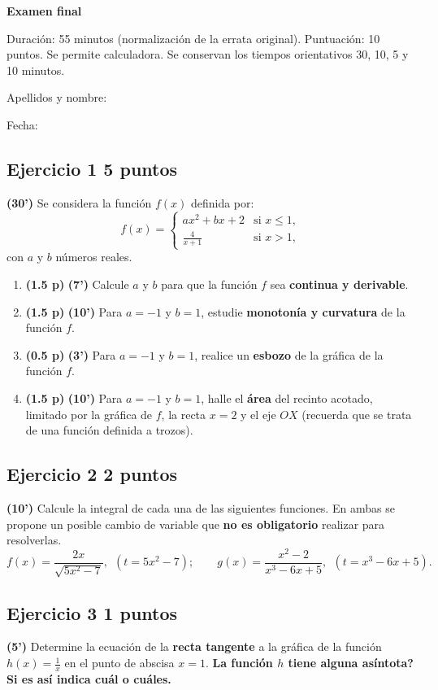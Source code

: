 \documentclass[11pt]{article}
\begin{document}
{\Large\bfseries Examen final}

Duración: 55 minutos (normalización de la errata original). Puntuación: 10 puntos. Se permite calculadora. Se conservan los tiempos orientativos 30, 10, 5 y 10 minutos.

Apellidos y nombre: \hrulefill

Fecha: \hrulefill


\subsection*{Ejercicio 1 \hfill 5 puntos} \textbf{(30')} Se considera la función \( f(x) \) definida por:
\[
f(x) = 
\begin{cases}
ax^2 + bx + 2 & \text{si } x \leq 1, \\
\displaystyle\frac{4}{x+1} & \text{si } x > 1,
\end{cases}
\]
con \( a \) y \( b \) números reales.

\begin{enumerate}
    \item[\textbf{a)}] \textbf{(1.5 p)} \textbf{(7')} Calcule \( a \) y \( b \) para que la función \( f \) sea \textbf{continua y derivable}.    
    \item[\textbf{b)}] \textbf{(1.5 p)} \textbf{(10')} Para \( a = -1 \) y \( b = 1 \), estudie \textbf{monotonía y curvatura} de la función \( f \).
    \item[\textbf{c)}] \textbf{(0.5 p)} \textbf{(3')} Para \( a = -1 \) y \( b = 1 \), realice un \textbf{esbozo} de la gráfica de la función \( f \).
    \item[\textbf{d)}] \textbf{(1.5 p)} \textbf{(10')} Para \( a = -1 \) y \( b = 1 \), halle el \textbf{área} del recinto acotado, limitado por la gráfica de \( f \), la recta \( x = 2 \) y el eje \( OX \) (recuerda que se trata de una función definida a trozos).
\end{enumerate}

 \subsection*{Ejercicio 2 \hfill 2 puntos}\textbf{(10')} Calcule la integral de cada una de las siguientes funciones. En ambas se propone un posible cambio de variable que \textbf{no es obligatorio} realizar para resolverlas.
\[
f(x) = \frac{2x}{\sqrt{5x^2-7}},~~(t=5x^2-7); \qquad g(x) = \frac{x^2-2}{x^3-6x+5},~~ (t=x^3-6x+5).
\]

\clearpage
\subsection*{Ejercicio 3 \hfill 1 puntos} \textbf{(5')} Determine la ecuación de la \textbf{recta tangente} a la gráfica de la función \( h(x) = \displaystyle \frac{1}{x} \) en el punto de abscisa \( x = 1 \). \textbf{\textquestiondown{}La función $h$ tiene alguna asíntota? Si es así indica cuál o cuáles.}
\end{document}
